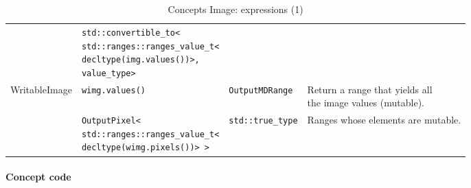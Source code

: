\begin{table}[H]
\begin{scriptsize}
\begin{tabular}{llll}
      \multicolumn{1}{c|}{}                               & \makecell[l]{\texttt{std::convertible\_to<}                                                                                             \\\texttt{std::ranges::ranges\_value\_t<} \\\texttt{decltype(img.values())>,} \\\texttt{value\_type>}} &      &  \\
      \cline{1-4}
      \multicolumn{1}{c|}{\multirow{2}{*}{WritableImage}} & \texttt{wimg.values()}                      & \texttt{OutputMDRange}                      & \makecell[l]{Return a range that yields all \\ the image values (mutable).} \\
      \multicolumn{1}{c|}{}                               & \makecell[l]{\texttt{OutputPixel<}                                                                                                      \\\texttt{std::ranges::ranges\_value\_t<} \\\texttt{decltype(wimg.pixels())> >}} & \texttt{std::true\_type}     & \multirow{2}{*}{Ranges whose elements are mutable.} \\
      \cline{1-4}
    \end{tabular}
    \smallskip

    \caption{Concepts Image: expressions (1)}
  \end{scriptsize}
  \label{table:concept.image.expressions.1}
\end{table}

\paragraph{Concept code}

